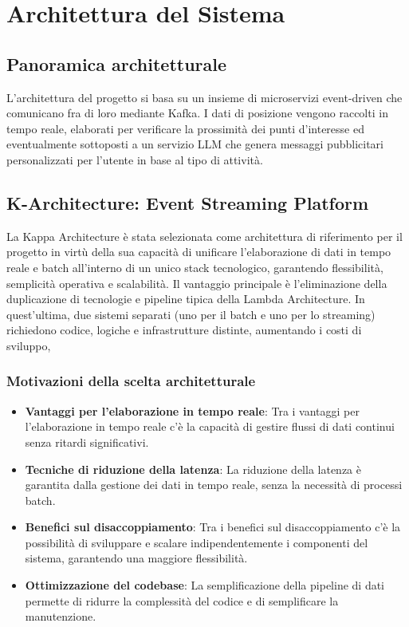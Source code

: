 \documentclass[10pt]{article}
\begin{document}
\newpage
\section{Architettura del Sistema}

\subsection{Panoramica architetturale}
L'architettura del progetto si basa su un insieme di microservizi event-driven che comunicano fra di loro mediante Kafka. I dati di posizione vengono raccolti in tempo reale, elaborati per verificare la prossimità dei punti d'interesse ed eventualmente sottoposti a un servizio LLM che genera messaggi pubblicitari personalizzati per l'utente in base al tipo di attività.

\subsection{K-Architecture: Event Streaming Platform}
La Kappa Architecture è stata selezionata come architettura di riferimento per il progetto in virtù della sua capacità di unificare l’elaborazione di dati in tempo reale e batch all’interno di un unico stack tecnologico, garantendo flessibilità, semplicità operativa e scalabilità. Il vantaggio principale è l’eliminazione della duplicazione di tecnologie e pipeline tipica della Lambda Architecture. In quest’ultima, due sistemi separati (uno per il batch e uno per lo streaming) richiedono codice, logiche e infrastrutture distinte, aumentando i costi di sviluppo,
    \subsubsection{Motivazioni della scelta architetturale}
        \begin{itemize}
        \item \textbf{Vantaggi per l'elaborazione in tempo reale}: Tra i vantaggi per l'elaborazione in tempo reale c'è la capacità di gestire flussi di dati continui senza ritardi significativi.
        \item \textbf{Tecniche di riduzione della latenza}: La riduzione della latenza è garantita dalla gestione dei dati in tempo reale, senza la necessità di processi batch.
        \item \textbf{Benefici sul disaccoppiamento}: Tra i benefici sul disaccoppiamento c'è la possibilità di sviluppare e scalare indipendentemente i componenti del sistema, garantendo una maggiore flessibilità.
        \item \textbf{Ottimizzazione del codebase}: La semplificazione della pipeline di dati permette di ridurre la complessità del codice e di semplificare la manutenzione.
    \end{itemize}
\end{document}
